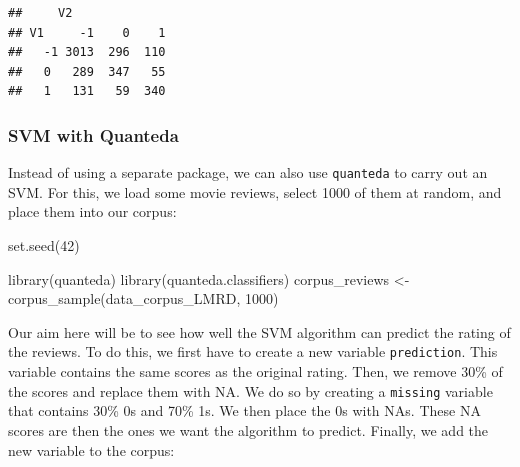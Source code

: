 \documentclass[
]{article}
\newenvironment{Shaded}{\begin{snugshade}}{\end{snugshade}}
\newcommand{\ConstantTok}[1]{\textcolor[rgb]{0.00,0.00,0.00}{#1}}
\newcommand{\DecValTok}[1]{\textcolor[rgb]{0.00,0.00,0.81}{#1}}
\newcommand{\FloatTok}[1]{\textcolor[rgb]{0.00,0.00,0.81}{#1}}
\newcommand{\FunctionTok}[1]{\textcolor[rgb]{0.00,0.00,0.00}{#1}}
\newcommand{\NormalTok}[1]{#1}
\newcommand{\OtherTok}[1]{\textcolor[rgb]{0.56,0.35,0.01}{#1}}
\newcommand{\SpecialCharTok}[1]{\textcolor[rgb]{0.00,0.00,0.00}{#1}}
\newcommand{\StringTok}[1]{\textcolor[rgb]{0.31,0.60,0.02}{#1}}
\begin{document}
\begin{verbatim}
##     V2
## V1     -1    0    1
##   -1 3013  296  110
##   0   289  347   55
##   1   131   59  340
\end{verbatim}

\hypertarget{svm-with-quanteda}{%
\subsubsection{SVM with Quanteda}\label{svm-with-quanteda}}

Instead of using a separate package, we can also use \texttt{quanteda} to carry out an SVM. For this, we load some movie reviews, select 1000 of them at random, and place them into our corpus:

\begin{Shaded}
\begin{Highlighting}[]
\FunctionTok{set.seed}\NormalTok{(}\DecValTok{42}\NormalTok{)}

\FunctionTok{library}\NormalTok{(quanteda)}
\FunctionTok{library}\NormalTok{(quanteda.classifiers)}
\NormalTok{corpus\_reviews }\OtherTok{\textless{}{-}} \FunctionTok{corpus\_sample}\NormalTok{(data\_corpus\_LMRD, }\DecValTok{1000}\NormalTok{)}
\end{Highlighting}
\end{Shaded}

Our aim here will be to see how well the SVM algorithm can predict the rating of the reviews. To do this, we first have to create a new variable \texttt{prediction}. This variable contains the same scores as the original rating. Then, we remove 30\% of the scores and replace them with NA. We do so by creating a \texttt{missing} variable that contains 30\% 0s and 70\% 1s. We then place the 0s with NAs. These NA scores are then the ones we want the algorithm to predict. Finally, we add the new variable to the corpus:

\begin{Shaded}
\end{Shaded}
\end{document}
